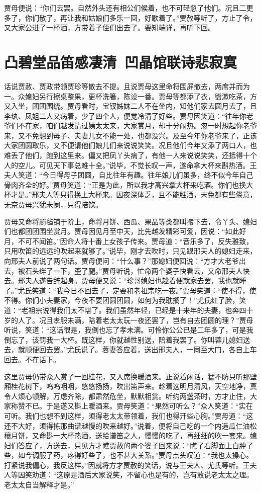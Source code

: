 \documentclass[12pt,oneside]{book}
\begin{document}
贾母便说：“你们去罢。自然外头还有相公们候着，也不可轻忽了他们。况且二更多了，你们散了，再让我和姑娘们多乐一回，好歇着了。”贾赦等听了，方止了令，又大家公进了一杯酒，方带着子侄们出去了。要知端详，再听下回。
 

 
\chapter{凸碧堂品笛感凄清~凹晶馆联诗悲寂寞}
话说贾赦、贾政带领贾珍等散去不提。且说贾母这里命将围屏撤去，两席并而为一。众媳妇另行擦桌整果，更杯洗箸，陈设一番。贾母等都添了衣，盥漱吃茶，方又入坐，团团围绕。贾母看时，宝钗姊妹二人不在坐内，知他们家去圆月去了，且李纨、凤姐二人又病着，少了四个人，便觉冷清了好些。贾母因笑道：“往年你老爷们不在家，咱们越发请过姨太太来，大家赏月，却十分闹热。忽一时想起你老爷来，又不免想到母子、夫妻儿女不能一处，也都没兴。及至今年你老爷来了，正该大家团圆取乐，又不便请他们娘儿们来说说笑笑。况且他们今年又添了两口人，也难丢了他们，跑到这里来。偏又把凤丫头病了，有他一人来说说笑笑，还抵得十个人的空儿。可见天下事总难十全。”说毕，不觉长叹一声，遂命拿大杯来斟热酒。王夫人笑道：“今日得母子团圆，自比往年有趣。往年娘儿们虽多，终不似今年自己骨肉齐全的好。”贾母笑道：“正是为此，所以我才高兴拿大杯来吃酒。你们也换大杯才是。”邢夫人等只得换上大杯来。因夜深体乏，且不能胜酒，未免都有些倦意，无奈贾母兴犹未阑，只得陪饮。

贾母又命将罽毡铺于阶上，命将月饼、西瓜、果品等类都叫搬下去，令丫头、媳妇们也都团团围坐赏月。贾母因见月至中天，比先越发精彩可爱，因说：“如此好月，不可不闻笛。”因命人将十番上女孩子传来。贾母道：“音乐多了，反失雅致，只用吹笛的远远的吹起来就够了。”说毕，刚才去吹时，只见跟邢夫人的媳妇走来，向邢夫人前说了两句话。贾母便问：“什么事？”那媳妇便回说：“方才大老爷出去，被石头绊了一下，歪了腿。”贾母听说，忙命两个婆子快看去，又命邢夫人快去。邢夫人遂告辞起身。贾母便又说：“珍哥媳妇也趁着便就家去罢，我也就睡了。”尤氏笑道：“我今日不回去了，定要和老祖宗吃一夜。”贾母笑道：“使不得，使不得。你们小夫妻家，今夜不要团圆团圆，如何为我耽搁了！”尤氏红了脸，笑道：“老祖宗说得我们太不堪了。我们虽然年轻，已经是十来年的夫妻，也奔四十岁的人了。况且孝服未满，陪着老太太玩一夜还罢了，岂有自去团圆的理？”贾母听说，笑道：“这话很是，我倒也忘了孝未满。可怜你公公已是二年多了，可是我倒忘了，该罚我一大杯。既这样，你就越性别送，陪着我罢了。你叫蓉儿媳妇送去，就顺便回去罢。”尤氏说了。蓉妻答应着，送出邢夫人，一同至大门，各自上车回去。不在话下。

这里贾母仍带众人赏了一回桂花，又入席换暖酒来。正说着闲话，猛不防只听那壁厢桂花树下，呜呜咽咽，悠悠扬扬，吹出笛声来。趁着这明月清风，天空地净，真令人烦心顿解，万虑齐除，都肃然危坐，默默相赏。听约两盏茶时，方才止住，大家称赞不已。于是遂又斟上暖酒来。贾母笑道：“果然可听么？”众人笑道：“实在可听。我们也想不到这样，须得老太太带领着，我们也得开些心胸。”贾母道：“这还不大好，须得拣那曲谱越慢的吹来越好。”说着，便将自己吃的一个内造瓜仁油松穰月饼，又命斟一大杯热酒，送给谱笛之人，慢慢的吃了，再细细的吹一套来。媳妇们答应了，方送去，只见方才瞧贾赦的两个婆子回来说：“瞧了右脚面上白肿了些，如今调服了药，疼得好些了，也不甚大关系。”贾母点头叹道：“我也太操心。打紧说我偏心，我反这样。”因就将方才贾赦的笑话，说与王夫人、尤氏等听。王夫人等因笑劝道：“这原是酒后大家说笑，不留心也是有的，岂有敢说老太太之理。老太太自当解释才是。”
\end{document}
